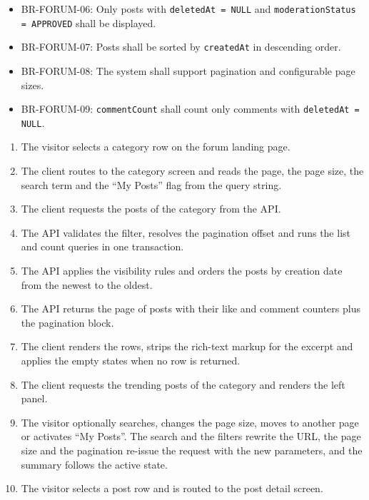 \begin{itemize}[leftmargin=1.6em,topsep=3pt,itemsep=2pt,parsep=0pt,label=$\bullet$]\brrulelist
      \item BR-FORUM-06: Only posts with \texttt{deletedAt = NULL} and
            \texttt{moderationStatus = APPROVED} shall be displayed.
      \item BR-FORUM-07: Posts shall be sorted by \texttt{createdAt} in descending order.
      \item BR-FORUM-08: The system shall support pagination and configurable page sizes.
      \item BR-FORUM-09: \texttt{commentCount} shall count only comments with
            \texttt{deletedAt = NULL}.
\end{itemize}

\begin{enumerate}[leftmargin=1.8em,topsep=3pt,itemsep=2pt,parsep=0pt]
      \item The visitor selects a category row on the forum landing page.
      \item The client routes to the category screen and reads the page, the page size, the
            search term and the ``My Posts'' flag from the query string.
      \item The client requests the posts of the category from the API.
      \item The API validates the filter, resolves the pagination offset and runs the list
            and count queries in one transaction.
      \item The API applies the visibility rules and orders the posts by creation date from
            the newest to the oldest.
      \item The API returns the page of posts with their like and comment counters plus the
            pagination block.
      \item The client renders the rows, strips the rich-text markup for the excerpt and
            applies the empty states when no row is returned.
      \item The client requests the trending posts of the category and renders the left
            panel.
      \item The visitor optionally searches, changes the page size, moves to another page
            or activates ``My Posts''. The search and the filters rewrite the URL, the page
            size and the pagination re-issue the request with the new parameters, and the
            summary follows the active state.
      \item The visitor selects a post row and is routed to the post detail screen.
\end{enumerate}


